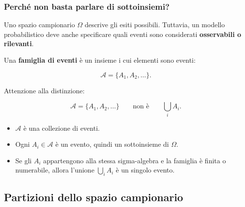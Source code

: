 \documentclass[handout]{beamer}%
\newenvironment{stepitemize}{\begin{itemize}[<+->]}{\end{itemize} }
\providecommand{\1}{\mathbf{1}}
\providecommand{\QTR}[2]{\csname #1\endcsname{#2}}
\begin{document}
\begin{frame}%
%

\frametitle{Perch\'{e} non basta parlare di sottoinsiemi?}%


Uno spazio campionario $\Omega$ descrive gli esiti possibili. Tuttavia, un
modello probabilistico deve anche specificare quali eventi sono considerati
\textbf{osservabili o rilevanti}.

\medskip

Una \textbf{famiglia di eventi} \`{e} un insieme i cui elementi sono eventi:%

\[
\mathcal{A}=\{A_{1},A_{2},\ldots\}.
\]


\medskip

Attenzione alla distinzione:%

\[
\mathcal{A}=\{A_{1},A_{2},\ldots\} \qquad\text{non \`{e}}\qquad\bigcup_{i}
A_{i}.
\]


\medskip

\begin{stepitemize}
\item $\mathcal{A}$ \`{e} una collezione di eventi.

\item Ogni $A_{i}\in\mathcal{A}$ \`{e} un evento, quindi un sottoinsieme di
$\Omega$.

\item Se gli $A_{i}$ appartengono alla stessa sigma-algebra e la famiglia
\`{e} finita o numerabile, allora l'unione $\bigcup_{i} A_{i}$ \`{e} un
singolo evento.
\end{stepitemize}

\medskip%

\transboxout
\end{frame}%




\subsection{Partizioni dello spazio campionario}%
\end{document}
